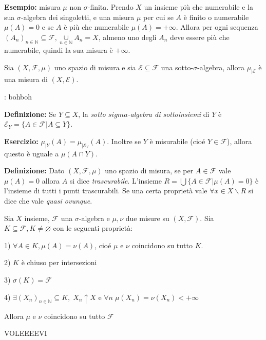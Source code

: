  \vspace{0.3cm}
 
 {\bf Esempio: } misura $\mu$ non $\sigma$-finita. Prendo $X$ un insieme più che numerabile e la sua $\sigma$-algebra dei singoletti, e una misura $\mu$ per cui se $A$ è finito o numerabile $\mu(A)=0$ e se $A$ è più che numerabile $\mu(A)=+\infty$. Allora per ogni sequenza $(A_n)_{n\in\mathbb{N}}\subseteq\mathcal{F}, \underset{n\in\mathbb{N}}{\cup}A_n=X$, almeno uno degli $A_n$ deve essere più che numerabile, quindi la sua misura è $+\infty$.
 
 \vspace{0.3cm}
 
 \Prop Sia $(X,\mathcal{F}, \mu)$ uno spazio di misura e sia $\mathcal{E} \subseteq \mathcal{F}$ una sotto-$\sigma$-algebra, allora $\mu_{|\mathcal{E}}$ è una misura di $(X,\mathcal{E})$.
 
 \Dim: bohboh
 
{\bf Definizione: } Se $Y\subseteq X$, la {\it sotto $sigma$-algebra di sottoinsiemi} di $Y$ è $\mathcal{E}_Y=\{A\in \mathcal{F} | A \subseteq Y\}$.

{\bf Esercizio: } $\mu_{|Y}(A)=\mu_{|\mathcal{E}_Y}(A)$. Inoltre se $Y$ è misurabile (cioé $Y\in \mathcal{F}$), allora questo è uguale a $\mu(A\cap Y)$.

{\bf Definizione: } Dato $(X,\mathcal{F}, \mu)$ uno spazio di misura, se per $A\in \mathcal{F}$ vale $\mu(A)=0$ allora $A$ si dice {\it trascurabile}. L'insieme $R=\bigcup \{A\in \mathcal{F} | \mu(A)=0\}$ è l'insieme di tutti i punti trascurabili. Se una certa proprietà vale $\forall x \in X\backslash R$ si dice che vale {\it quasi ovunque}. 

\vspace{0.3cm}
Sia $X$ insieme, $\mathcal{F}$ una $\sigma$-algebra e $\mu, \nu$ due misure su $(X,\mathcal{F})$. Sia $K\subseteq \mathcal{F}, K\neq \varnothing$ con le seguenti proprietà:

1) $\forall A \in K, \mu(A)=\nu(A)$, cioé $\mu$ e $\nu$ coincidono su tutto $K$.

2) $K$ è chiuso per intersezioni

3) $\sigma(K)=\mathcal{F}$

4) $\exists (X_n)_{n\in \mathbb{N}}\subseteq K, \; X_n \uparrow X$ e $\forall n\; \mu(X_n)=\nu(X_n)<+\infty$

Allora $\mu$ e $\nu$ coincidono su tutto $\mathcal{F}$

\Dim VOLEEEEVI

